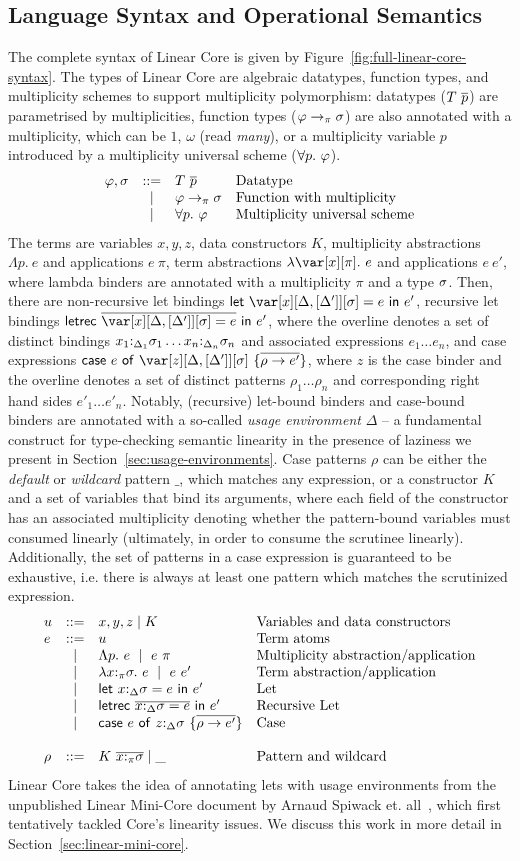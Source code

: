 \documentclass[acmsmall, screen, review]{acmart}
\newcommand{\llet}[2]{\mathsf{let}~#1~\mathsf{in}~#2}
\newcommand{\lletrec}[2]{\mathsf{letrec}~#1~\mathsf{in}~#2}
\newcommand{\ccase}[2]{\mathsf{case}~#1~\mathsf{of}~#2}
\begin{document}

\subsection{Language Syntax and Operational Semantics}

The complete syntax of Linear Core is given by Figure~\ref{fig:full-linear-core-syntax}.
%
The types of Linear Core are algebraic datatypes, function types, and
multiplicity schemes to support multiplicity polymorphism: datatypes
($T~\overline{p}$) are parametrised by multiplicities, function types
($\varphi\to_\pi\sigma$) are also annotated with a multiplicity, which can be $1$,
$\omega$ (read \emph{many}), or a multiplicity variable $p$ introduced by a
multiplicity universal scheme ($\forall p.~\varphi$).
%
\[
 \begin{array}{lcll} \varphi,\sigma & ::= & T~\overline{p} & \textrm{Datatype} \\ & \mid & \varphi \to_\pi \sigma & \textrm{Function with multiplicity}\\ & \mid & \forall p.~\varphi & \textrm{Multiplicity universal scheme}\\ \end{array} 
\]
%
The terms are variables $x,y,z$, data constructors $K$, multiplicity
abstractions $\Lambda p.~e$ and applications $e~\pi$, term abstractions
$\lambda \x[\pi].~e$ and applications $e~e'$, where lambda binders are
annotated with a multiplicity $\pi$ and a type $\sigma$. Then, there are
non-recursive let bindings $\llet{\xD = e}{e'}$, recursive let bindings
$\lletrec{\ov{\xD = e}}{e'}$, where the overline denotes a set of distinct
bindings $x_1{:}_{\Delta_1}\sigma_1\dots x_n{:}_{\Delta_n}\sigma_n$ and associated expressions
$e_1\dots e_n$, and case expressions $\ccase{e}{\zD~\{\ov{\rho \to e'}\}}$,
where $z$ is the case binder and the overline denotes a set of distinct
patterns $\rho_1\dots \rho_n$ and corresponding right hand sides $e'_1\dots
e'_n$. Notably, (recursive) let-bound
binders and case-bound binders are annotated
with a so-called \emph{usage environment} $\Delta$ -- a fundamental construct
for type-checking semantic linearity in the presence of laziness we present in
Section~\ref{sec:usage-environments}.
%
Case patterns $\rho$ can be either the \emph{default} or \emph{wildcard}
pattern $\_$, which matches any expression, or a constructor $K$ and a set of
variables that bind its arguments, where each field of the constructor has an
associated multiplicity denoting whether the pattern-bound variables must
consumed linearly (ultimately, in order to consume the scrutinee linearly).
Additionally, the set of patterns in a case expression is guaranteed to be exhaustive,
i.e. there is always at least one pattern which matches the scrutinized expression.
\[
\SyntaxTerms
\]
Linear Core takes the idea of annotating lets with usage environments from the
unpublished Linear Mini-Core document by Arnaud Spiwack et.
all~\cite{cite:minicore}, which first tentatively tackled Core's
linearity issues. We discuss this work in more detail in
Section~\ref{sec:linear-mini-core}.
\end{document}
